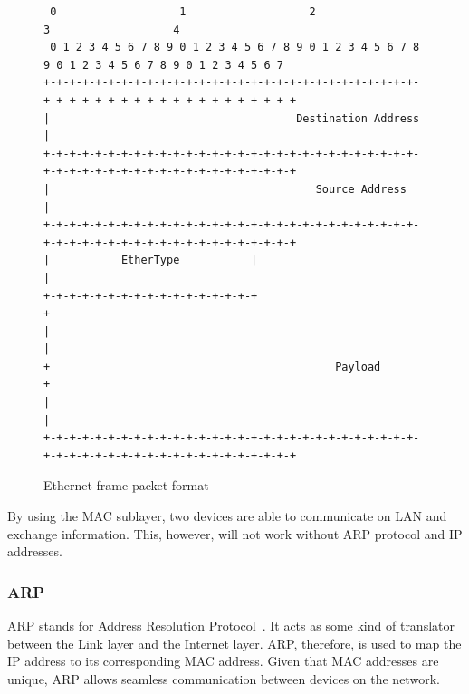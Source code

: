 \documentclass[
  printed,     %
  color,       %
  oneside,     %
  nosansbold,  %
  nocolorbold, %
  nolof,         %
  nolot,         %
]{fithesis4}
\begin{document}
\begin{figure}[h]
\fontsize{7pt}{7pt}\selectfont
\begin{center}
\begin{BVerbatim}
 0                   1                   2                   3                   4              
 0 1 2 3 4 5 6 7 8 9 0 1 2 3 4 5 6 7 8 9 0 1 2 3 4 5 6 7 8 9 0 1 2 3 4 5 6 7 8 9 0 1 2 3 4 5 6 7
+-+-+-+-+-+-+-+-+-+-+-+-+-+-+-+-+-+-+-+-+-+-+-+-+-+-+-+-+-+-+-+-+-+-+-+-+-+-+-+-+-+-+-+-+-+-+-+-+
|                                      Destination Address                                      |
+-+-+-+-+-+-+-+-+-+-+-+-+-+-+-+-+-+-+-+-+-+-+-+-+-+-+-+-+-+-+-+-+-+-+-+-+-+-+-+-+-+-+-+-+-+-+-+-+
|                                         Source Address                                        |
+-+-+-+-+-+-+-+-+-+-+-+-+-+-+-+-+-+-+-+-+-+-+-+-+-+-+-+-+-+-+-+-+-+-+-+-+-+-+-+-+-+-+-+-+-+-+-+-+
|           EtherType           |                                                               |
+-+-+-+-+-+-+-+-+-+-+-+-+-+-+-+-+                                                               +
|                                                                                               |
+                                            Payload                                            +
|                                                                                               |
+-+-+-+-+-+-+-+-+-+-+-+-+-+-+-+-+-+-+-+-+-+-+-+-+-+-+-+-+-+-+-+-+-+-+-+-+-+-+-+-+-+-+-+-+-+-+-+-+
\end{BVerbatim}
  \end{center}
  \caption{Ethernet frame packet format~\cite{9844436}}
  \label{fig:mac_frame}
\end{figure}

By using the MAC sublayer, two devices are able to communicate on LAN and exchange information. This, however, will not work without ARP protocol and IP addresses.

\subsubsection{ARP}
\label{sec:arp}

ARP stands for Address Resolution Protocol~\cite{10.5555/2584507}. It acts as some kind of translator between the Link layer and the Internet layer. ARP, therefore, is used to map the IP address to its corresponding MAC address. Given that MAC addresses are unique, ARP allows seamless communication between devices on the network.

\medskip
\end{document}
